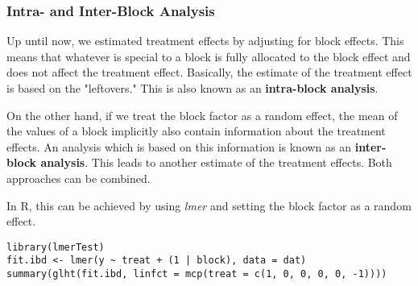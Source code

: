\subsubsection{Intra- and Inter-Block Analysis}

Up until now, we estimated treatment effects by adjusting for block effects. This means that whatever is special to a block is fully allocated to the block effect and does not affect the treatment effect. Basically, the estimate of the treatment effect is based on the "leftovers." This is also known as an \textbf{intra-block analysis}. \medskip

On the other hand, if we treat the block factor as a random effect, the mean of the values of a block implicitly also contain information about the treatment effects. An analysis which is based on this information is known as an \textbf{inter-block analysis}. This leads to another estimate of the treatment effects. Both approaches can be combined. \medskip

In R, this can be achieved by using \textit{lmer} and setting the block factor as a random effect.
\begin{lstlisting}
library(lmerTest)
fit.ibd <- lmer(y ~ treat + (1 | block), data = dat)
summary(glht(fit.ibd, linfct = mcp(treat = c(1, 0, 0, 0, 0, -1))))
\end{lstlisting}